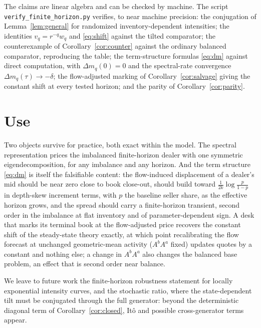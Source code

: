 \documentclass[11pt]{article}
\begin{document}
The claims are linear algebra and can be checked by machine. The script \texttt{verify\_finite\_horizon.py} verifies, to near machine precision: the conjugation of Lemma~\ref{lem:general} for randomized inventory-dependent intensities; the identities $v_q = r^{-q} w_q$ and \eqref{eq:shift} against the tilted comparator; the counterexample of Corollary~\ref{cor:counter} against the ordinary balanced comparator, reproducing the table; the term-structure formulas \eqref{eq:dm} against direct computation, with $\Delta m_q(0) = 0$ and the spectral-rate convergence $\Delta m_q(\tau) \to -\delta$; the flow-adjusted marking of Corollary~\ref{cor:salvage} giving the constant shift at every tested horizon; and the parity of Corollary~\ref{cor:parity}.

\section{Use}\label{sec:use}

Two objects survive for practice, both exact within the model. The spectral representation prices the imbalanced finite-horizon dealer with one symmetric eigendecomposition, for any imbalance and any horizon. And the term structure \eqref{eq:dm} is itself the falsifiable content: the flow-induced displacement of a dealer's mid should be near zero close to book close-out, should build toward $\tfrac{1}{2k}\log\tfrac{p}{1-p}$ in depth-skew increment terms, with $p$ the baseline seller share, as the effective horizon grows, and the spread should carry a finite-horizon transient, second order in the imbalance at flat inventory and of parameter-dependent sign. A desk that marks its terminal book at the flow-adjusted price recovers the constant shift of the steady-state theory exactly, at which point recalibrating the flow forecast at unchanged geometric-mean activity ($A^b A^a$ fixed) updates quotes by a constant and nothing else; a change in $A^b A^a$ also changes the balanced base problem, an effect that is second order near balance.

We leave to future work the finite-horizon robustness statement for locally exponential intensity curves, and the stochastic ratio, where the state-dependent tilt must be conjugated through the full generator: beyond the deterministic diagonal term of Corollary~\ref{cor:closed}, It\^o and possible cross-generator terms appear.
\end{document}
